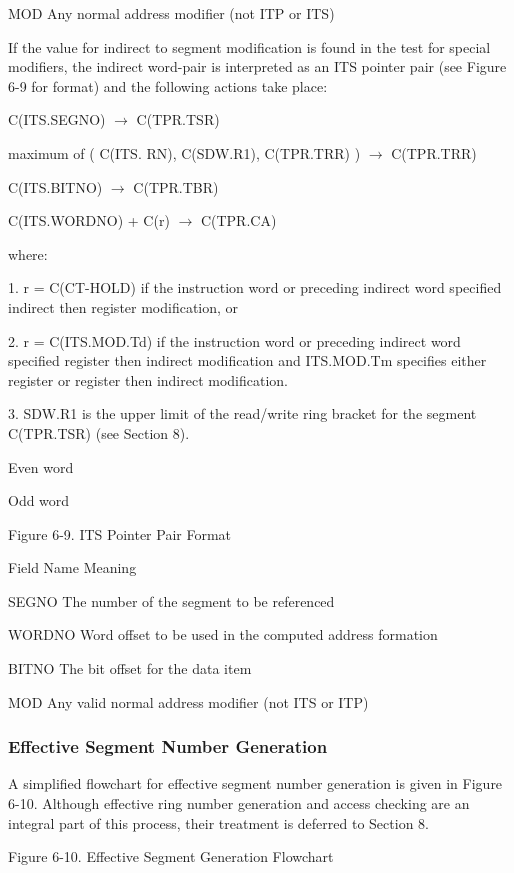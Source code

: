 MOD Any normal address modifier (not ITP or ITS)




If the value for indirect to segment modification is found in the test for
special modifiers, the indirect word-pair is interpreted as an ITS pointer pair
(see Figure 6-9 for format) and the following actions take place:

C(ITS.SEGNO) $\rightarrow$ C(TPR.TSR)

maximum of ( C(ITS. RN), C(SDW.R1), C(TPR.TRR) ) $\rightarrow$ C(TPR.TRR)

C(ITS.BITNO) $\rightarrow$ C(TPR.TBR)

C(ITS.WORDNO) + C(r) $\rightarrow$ C(TPR.CA)

where:

1. r = C(CT-HOLD) if the instruction word or preceding indirect word specified
indirect then register modification, or 

2. r = C(ITS.MOD.Td) if the instruction word or preceding indirect word
specified register then indirect modification and ITS.MOD.Tm specifies either
register or register then indirect modification.

3. SDW.R1 is the upper limit of the read/write ring bracket for the segment
C(TPR.TSR) (see Section 8).

Even word

Odd word

Figure 6-9. ITS Pointer Pair Format

Field Name Meaning

SEGNO The number of the segment to be referenced

WORDNO Word offset to be used in the computed address formation 

BITNO The bit offset for the data item

MOD Any valid normal address modifier (not ITS or ITP)

\subsubsection{Effective Segment Number Generation}

A simplified flowchart for effective segment number generation is given in
Figure 6-10.  Although effective ring number generation and access checking are
an integral part of this process, their treatment is deferred to Section 8.


Figure 6-10. Effective Segment Generation Flowchart

